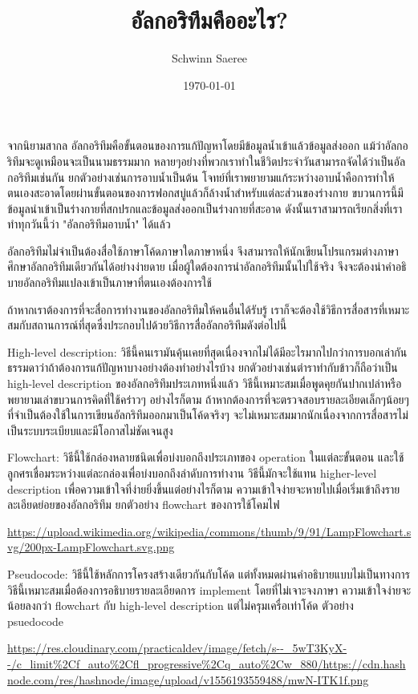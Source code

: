 \documentclass[11pt]{article}
\author{Schwinn Saeree}
\date{\today}
\title{อัลกอริทึมคืออะไร?}
\begin{document}
\maketitle
\tableofcontents

จากนิยามสากล อัลกอริทึมคือขั้นตอนของการแก้ปัญหาโดยมีข้อมูลน้ำเข้าแล้วข้อมูลส่งออก แม้ว่าอัลกอริทึมจะดูเหมือนจะเป็นนามธรรมมาก หลายๆอย่างที่พวกเราทำในชีวิตประจำวันสามารถจัดได้ว่าเป็นอัลกอริทึมเช่นกัน ยกตัวอย่างเช่นการอาบน้ำเป็นต้น โจทย์ที่เราพยายามแก้ระหว่างอาบน้ำคือการทำให้ตนเองสะอาดโดยผ่านขั้นตอนของการฟอกสบู่แล้วก็ล้างน้ำสำหรับแต่ละส่วนของร่างกาย ขบวนการนี้มีข้อมูลนำเข้าเป็นร่างกายที่สกปรกและข้อมูลส่งออกเป็นร่างกายที่สะอาด ดังนั้นเราสามารถเรียกสิ่งที่เราทำทุกวันนี้ว่า "อัลกอริทึมอาบน้ำ" ได้แล้ว

อัลกอริทึมไม่จำเป็นต้องสื่อใช้ภาษาโค้ดภาษาใดภาษาหนึ่ง จึงสามารถให้นักเขียนโปรแกรมต่างภาษาศึกษาอัลกอริทึมเดียวกันได้อย่างง่ายดาย เมื่อผู้ใดต้องการนำอัลกอริทึมนั้นไปใช้จริง จึงจะต้องนำคำอธิบายอัลกอริทึมแปลงเข้าเป็นภาษาที่ตนเองต้องการใช้

ถ้าหากเราต้องการที่จะสื่อการทำงานของอัลกอริทึมให้คนอื่นได้รับรู้ เราก็จะต้องใช้วิธีการสื่อสารที่เหมาะสมกับสถานการณ์ที่สุดซึ่งประกอบไปด้วยวิธีการสื่ออัลกอริทึมดังต่อไปนี้

High-level description: วิธีนี้คนเรามันคุ้นเคยที่สุดเนื่องจากไม่ได้มีอะไรมากไปกว่าการบอกเล่ากันธรรมดาว่าถ้าต้องการแก้ปัญหาบางอย่างต้องทำอย่างไรบ้าง ยกตัวอย่างเช่นตำราทำกับข้าวก็ถือว่าเป็น high-level description ของอัลกอริทึมประเภทหนึ่งแล้ว วิธีนี้เหมาะสมเมื่อพูดคุยกันปากเปล่าหรือพยายามเล่าขบวนการคิดที่ใช้คร่าวๆ อย่างไรก็ตาม ถ้าหากต้องการที่จะตรวจสอบรายละเอียดเล็กๆน้อยๆที่จำเป็นต้องใช้ในการเขียนอัลกริทึมออกมาเป็นโค้ดจริงๆ จะไม่เหมาะสมมากนักเนื่องจากการสื่อสารไม่เป็นระบบระเบียบและมีโอกาสไม่ชัดเจนสูง

Flowchart: วิธีนี้ใช้กล่องหลายชนิดเพื่อบ่งบอกถึงประเภทของ operation ในแต่ละขั้นตอน และใช้ลูกศรเชื่อมระหว่างแต่ละกล่องเพื่อบ่งบอกถึงลำดับการทำงาน วิธีนี้มักจะใช้แทน higher-level description เพื่อความเข้าใจที่ง่ายยิ่งขึ้นแต่อย่างไรก็ตาม ความเข้าใจง่ายจะหายไปเมื่อเริ่มเข้าถึงรายละเอียดย่อยของอัลกอริทึม
ยกตัวอย่าง flowchart ของการใช้โคมไฟ

\url{https://upload.wikimedia.org/wikipedia/commons/thumb/9/91/LampFlowchart.svg/200px-LampFlowchart.svg.png}

Pseudocode: วิธีนี้ใช้หลักการโครงสร้างเดียวกันกับโค้ด แต่ทั้งหมดผ่านคำอธิบายแบบไม่เป็นทางการ วิธีนี้เหมาะสมเมื่อต้องการอธิบายรายละเอียดการ implement โดยที่ไม่เจาะจงภาษา ความเข้าใจง่ายจะน้อยลงกว่า flowchart กับ high-level description แต่ไม่ครุมเครื่อเท่าโค้ด ตัวอย่าง psuedocode

\url{https://res.cloudinary.com/practicaldev/image/fetch/s--\_5wT3KyX--/c\_limit\%2Cf\_auto\%2Cfl\_progressive\%2Cq\_auto\%2Cw\_880/https://cdn.hashnode.com/res/hashnode/image/upload/v1556193559488/mwN-ITK1f.png}
\end{document}
